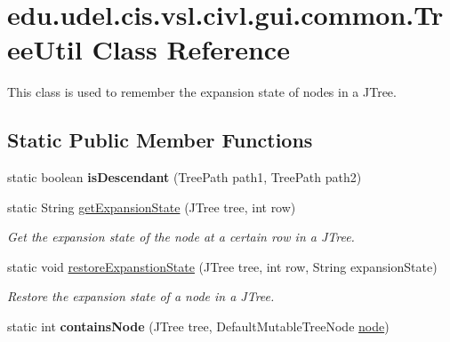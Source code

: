 \hypertarget{classedu_1_1udel_1_1cis_1_1vsl_1_1civl_1_1gui_1_1common_1_1TreeUtil}{}\section{edu.\+udel.\+cis.\+vsl.\+civl.\+gui.\+common.\+Tree\+Util Class Reference}
\label{classedu_1_1udel_1_1cis_1_1vsl_1_1civl_1_1gui_1_1common_1_1TreeUtil}


This class is used to remember the expansion state of nodes in a J\+Tree.  


\subsection*{Static Public Member Functions}
\begin{DoxyCompactItemize}
\item 
\hypertarget{classedu_1_1udel_1_1cis_1_1vsl_1_1civl_1_1gui_1_1common_1_1TreeUtil_acfabe139d036a84cc59cd5b8bcc20409}{}static boolean {\bfseries is\+Descendant} (Tree\+Path path1, Tree\+Path path2)\label{classedu_1_1udel_1_1cis_1_1vsl_1_1civl_1_1gui_1_1common_1_1TreeUtil_acfabe139d036a84cc59cd5b8bcc20409}

\item 
static String \hyperlink{classedu_1_1udel_1_1cis_1_1vsl_1_1civl_1_1gui_1_1common_1_1TreeUtil_a9671c867e6937b4d3112706a9872ade0}{get\+Expansion\+State} (J\+Tree tree, int row)
\begin{DoxyCompactList}\small\item\em Get the expansion state of the node at a certain row in a J\+Tree. \end{DoxyCompactList}\item 
static void \hyperlink{classedu_1_1udel_1_1cis_1_1vsl_1_1civl_1_1gui_1_1common_1_1TreeUtil_ae195b447b6d7a5007157d9cdf6708336}{restore\+Expanstion\+State} (J\+Tree tree, int row, String expansion\+State)
\begin{DoxyCompactList}\small\item\em Restore the expansion state of a node in a J\+Tree. \end{DoxyCompactList}\item 
\hypertarget{classedu_1_1udel_1_1cis_1_1vsl_1_1civl_1_1gui_1_1common_1_1TreeUtil_a5b46d8f189b4e2910e7cb49224bb8089}{}static int {\bfseries contains\+Node} (J\+Tree tree, Default\+Mutable\+Tree\+Node \hyperlink{structnode}{node})\label{classedu_1_1udel_1_1cis_1_1vsl_1_1civl_1_1gui_1_1common_1_1TreeUtil_a5b46d8f189b4e2910e7cb49224bb8089}

\end{DoxyCompactItemize}


